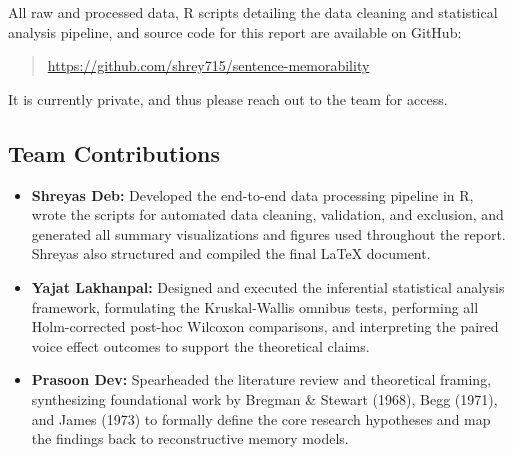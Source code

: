 \documentclass[12pt, a4paper]{article}
\begin{document}
{\small
All raw and processed data, R scripts detailing the data cleaning and statistical analysis pipeline, and source code for this report are available on GitHub: 

\begin{quote}
\url{https://github.com/shrey715/sentence-memorability}
\end{quote}

It is currently private, and thus please reach out to the team for access.

\subsection*{Team Contributions}
\begin{itemize}[noitemsep]
  \item \textbf{Shreyas Deb:} Developed the end-to-end data processing pipeline in R, wrote the scripts for automated data cleaning, validation, and exclusion, and generated all summary visualizations and figures used throughout the report. Shreyas also structured and compiled the final LaTeX document.
  \item \textbf{Yajat Lakhanpal:} Designed and executed the inferential statistical analysis framework, formulating the Kruskal-Wallis omnibus tests, performing all Holm-corrected post-hoc Wilcoxon comparisons, and interpreting the paired voice effect outcomes to support the theoretical claims.
  \item \textbf{Prasoon Dev:} Spearheaded the literature review and theoretical framing, synthesizing foundational work by Bregman \& Stewart (1968), Begg (1971), and James (1973) to formally define the core research hypotheses and map the findings back to reconstructive memory models.
\end{itemize}
}

{\small


}
\end{document}
